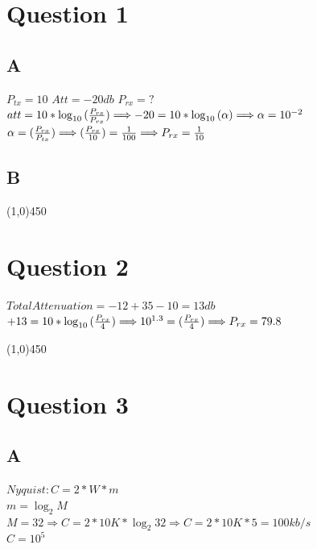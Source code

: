 \documentclass[a4paper,12pt]{book}
\begin{document}
\section {Question 1}

\subsection{A}
\begin{doublespace}
 $ P_{tx} = 10 $\nnl
 $Att = -20 db$ \nnl
$P_{rx} = ? $ \nnl
\noindent $ att = 10 * \log_{10} {(\frac {P_{rx}}{P_{rx}})}  \Longrightarrow -20 =  10 * \log_{10} {(\alpha)}   \Longrightarrow   \alpha = 10^{-2}          $ \nnl
$ \alpha = (\frac {P_{rx}}{P_{tx}})  \Longrightarrow (\frac {P_{rx}}{10})  =   \frac {1}{100}   \Longrightarrow   P_{rx} =  \frac {1}{10} $\nnl
\end{doublespace}




\subsection{B}
\line(1,0){450}

\section {Question 2 }
\begin{doublespace}
$Total Attenuation = -12 + 35 - 10 = 13 db $ \\
$+13 = 10 * \log_{10} {(\frac {P_{rx}}{4})}  \Longrightarrow 10^{1.3} = (\frac {P_{rx}}{4}) \Longrightarrow P_{rx} = 79.8 $
\end{doublespace}
\line(1,0){450}
\section {Question 3 }

\subsection{A}
\begin{doublespace}
$Nyquist : C = 2 * W * m $ \\
$m = \log_2 {M}$\\
$M = 32 \Longrightarrow C = 2 * 10 K * \log_{2} {32}  \Longrightarrow C = 2 * 10K * 5 = 100 kb/s$\\
$C = 10^5$
\end{doublespace}
\end{document}
